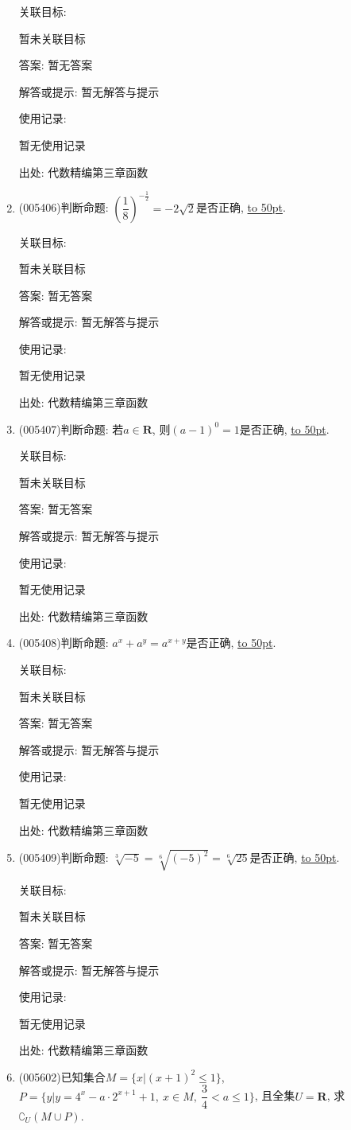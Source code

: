 \documentclass[10pt,a4paper]{article}
\newcommand{\blank}[1]{\underline{\hbox to #1pt{}}}
\begin{document}
\begin{enumerate}[1.]
关联目标:

暂未关联目标

答案: 暂无答案

解答或提示: 暂无解答与提示

使用记录:

暂无使用记录


出处: 代数精编第三章函数
\item { (005406)}判断命题: $(\dfrac 18)^{-\frac 12}=-2\sqrt 2$是否正确, \blank{50}.


关联目标:

暂未关联目标

答案: 暂无答案

解答或提示: 暂无解答与提示

使用记录:

暂无使用记录


出处: 代数精编第三章函数
\item { (005407)}判断命题: 若$a\in \mathbf{R}$, 则$(a-1)^0=1$是否正确, \blank{50}.


关联目标:

暂未关联目标

答案: 暂无答案

解答或提示: 暂无解答与提示

使用记录:

暂无使用记录


出处: 代数精编第三章函数
\item { (005408)}判断命题: $a^x+a^y=a^{x+y}$是否正确, \blank{50}.


关联目标:

暂未关联目标

答案: 暂无答案

解答或提示: 暂无解答与提示

使用记录:

暂无使用记录


出处: 代数精编第三章函数
\item { (005409)}判断命题: $\sqrt [3]{-5}=\sqrt [6]{(-5)^2}=\sqrt [6]{25}$是否正确, \blank{50}.


关联目标:

暂未关联目标

答案: 暂无答案

解答或提示: 暂无解答与提示

使用记录:

暂无使用记录


出处: 代数精编第三章函数
\item { (005602)}已知集合$M=\{x|(x+1)^2\le 1\}$, $P=\{y|y=4^x-a\cdot 2^{x+1}+1,\ x\in M,\ \dfrac 34<a\le 1\}$, 且全集$U=\mathbf{R}$, 求$\complement _U(M\cup P)$.



\end{enumerate}
\end{document}
